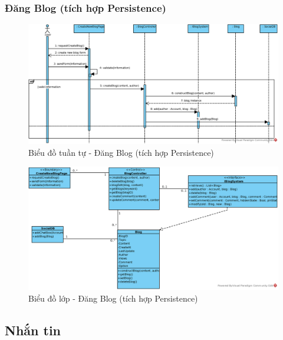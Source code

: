\documentclass[./../main.tex]{subfiles}
\begin{document}
\subsubsection{Đăng Blog (tích hợp Persistence)}
\begin{figure}[H]
	\centering
	\includegraphics[width=\linewidth]{./images/UseCaseDesignDiagram/ucr_per_create_blog.eps}
	\caption{Biểu đồ tuần tự - Đăng Blog (tích hợp Persistence)}
\end{figure}
\begin{figure}[H]
	\centering
	\includegraphics[width=\linewidth]{./images/UseCaseDesignDiagram/ucd_per_blog.eps}
	\caption{Biểu đồ lớp - Đăng Blog (tích hợp Persistence)}
\end{figure}

\subsection{Nhắn tin}
\end{document}
